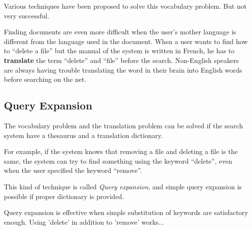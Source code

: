 \documentclass[manuscript,screen,review]{acmart}
\begin{document}
Various techniques have been proposed to solve this vocabulary problem.
But not very successful.

Finding documents are even more difficult when
the user's mother language is different from the language used in the document.
When a user wants to find how to ``delete a file'' but the
manual of the system is written in French,
he has to \textbf{translate} the term ``delete'' and ``file''
before the search.
Non-English speakers are always having trouble
translating the word in their brain into English words
before searching on the net.



\subsection{Query Expansion}

The vocabulary problem and the translation problem can be solved
if the search system have a thesaurus and a translation dictionary.

For example, 
if the system knows that removing a file and deleting a file is the same,
the system can try to find something using the keyword ``delete'',
even when the user specified the keyword ``remove''.

This kind of technique is called \textit{Query expansion}, and simple query
expansion is possible if proper dictionary is provided.


% 

Query expansion is effective when simple substitution of keywords are satisfactory enough.
Using 'delete' in addition to 'remove' works...
\end{document}
